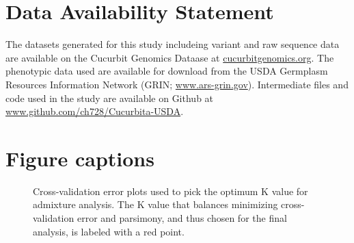 \documentclass[utf8]{FrontiersinHarvard} %
\begin{document}
\section*{Data Availability Statement}
The datasets generated for this study includeing variant and raw sequence data are available on the Cucurbit Genomics Dataase at \href{https://cucurbitgenomics.org}{cucurbitgenomics.org}. The phenotypic data used are available for download from the USDA Germplasm Resources Information Network (GRIN; \href{https://www.ars-grin.gov}{www.ars-grin.gov}). Intermediate files and code used in the study are available on Github at \href{https://www.github.com/ch728/Cucurbita-USDA}{www.github.com/ch728/Cucurbita-USDA}.




\section*{Figure captions}


\begin{figure}[h]
	\caption{Cross-validation error plots used to pick the optimum K value for admixture analysis. The K value that balances minimizing cross-validation error and parsimony, and thus chosen for the final analysis, is labeled with a red point. \label{fig:1}}
\end{figure}
\end{document}
